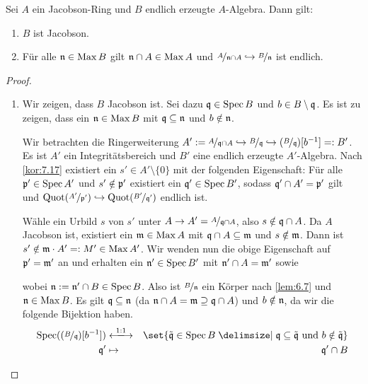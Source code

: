 \documentclass[12pt,a4paper]{scrartcl}
\theoremstyle{cplain}
\theoremstyle{cdef}
\begin{document}
\begin{satz} \label{thm:7.22}
	Sei $A$ ein Jacobson-Ring und $B$ endlich erzeugte $A$-Algebra. Dann gilt:
	\begin{enumerate}
		\item $B$ ist Jacobson. \label{thm:7.22:i}
		\item Für alle $\mathfrak{n} \in \operatorname{Max} B$ gilt $\mathfrak{n} \cap A \in \operatorname{Max} A$ und $\nicefrac{A}{\mathfrak{n} \cap A} \hookrightarrow \nicefrac{B}{\mathfrak{n}}$ ist endlich. \label{thm:7.22:ii}
	\end{enumerate}
\end{satz}
\begin{proof}
	\leavevmode
	\begin{enumerate}[label=\ref{thm:7.22:\roman*}]
		\item Wir zeigen, dass $B$ Jacobson ist. Sei dazu $\mathfrak{q} \in \operatorname{Spec} B$ und $b \in B \setminus \mathfrak{q}$. Es ist zu zeigen, dass ein $\mathfrak{n} \in \operatorname{Max} B$ mit $\mathfrak{q} \subseteq \mathfrak{n}$ und $b \notin \mathfrak{n}$.
		
		Wir betrachten die Ringerweiterung $A' := \nicefrac{A}{\mathfrak{q} \cap A} \hookrightarrow \nicefrac{B}{\mathfrak{q}} \hookrightarrow (\nicefrac{B}{\mathfrak{q}})[b^{-1}] =: B'$. Es ist $A'$ ein Integritätsbereich und $B'$ eine endlich erzeugte $A'$-Algebra. Nach \cref{kor:7.17} existiert ein $s' \in A' \setminus \{0\}$ mit der folgenden Eigenschaft: Für alle $\mathfrak{p}' \in \operatorname{Spec} A'$ und $s' \notin \mathfrak{p}'$ existiert ein $\mathfrak{q}' \in \operatorname{Spec} B'$, sodass $\mathfrak{q}' \cap A' = \mathfrak{p}'$ gilt und $\operatorname{Quot}(\nicefrac{A'}{\mathfrak{p}'}) \hookrightarrow \operatorname{Quot}(\nicefrac{B'}{\mathfrak{q}'})$ endlich ist.
		
		Wähle ein Urbild $s$ von $s'$ unter $A \to A' = \nicefrac{A}{\mathfrak{q} \cap A}$, also $s \notin \mathfrak{q} \cap A$. Da $A$ Jacobson ist, existiert ein $\mathfrak{m} \in \operatorname{Max} A$ mit $\mathfrak{q} \cap A \subseteq \mathfrak{m}$ und $s \notin \mathfrak{m}$. Dann ist $s' \notin \mathfrak{m} \cdot A' =: M' \in \operatorname{Max} A'$. Wir wenden nun die obige Eigenschaft auf $\mathfrak{p}'=\mathfrak{m}'$ an und erhalten ein $\mathfrak{n}' \in \operatorname{Spec} B'$ mit $\mathfrak{n}' \cap A = \mathfrak{m}'$ sowie 
		\begin{center}
		\end{center}
		wobei $\mathfrak{n} := \mathfrak{n}' \cap B \in \operatorname{Spec} B$. Also ist $\nicefrac{B}{\mathfrak{n}}$ ein Körper nach \cref{lem:6.7} und $\mathfrak{n} \in \operatorname{Max} B$.
		Es gilt $\mathfrak{q} \subseteq \mathfrak{n}$ (da $\mathfrak{n} \cap A = \mathfrak{m} \supseteq \mathfrak{q} \cap A$) und $b \notin \mathfrak{n}$, da wir die folgende Bijektion haben. \begin{eqnarray*}
			\Spec((\fak B\fq)[b^{-1}]) &\xlongleftrightarrow{1:1}& \set{\tilde \fq \in \Spec B \given \fq \subseteq \tilde \fq \text{ und } b \notin \tilde \fq} \\
			\fq'& \mapsto &\fq' \cap B
		\end{eqnarray*}


\end{enumerate}
\end{proof}
\end{document}
